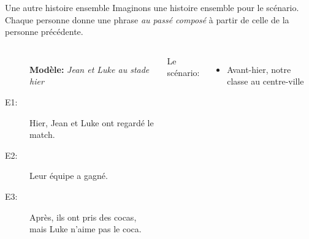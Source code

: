 \begin{frame}{Une autre histoire ensemble}
  Imaginons une histoire ensemble pour le scénario.
  Chaque personne donne une phrase \emph{au passé composé} à partir de celle de la personne précédente. \\
  \begin{columns}
      \small
      \begin{description}
        \item[] \textbf{Modèle:} \emph{Jean et Luke au stade hier}
        \item[E1:] Hier, Jean et Luke ont regardé le match.
        \item[E2:] Leur équipe a gagné.
        \item[E3:] Après, ils ont pris des cocas, mais Luke n'aime pas le coca.
      \end{description}
      \alert{Le scénario:}
      \begin{itemize}
        \item Avant-hier, notre classe au centre-ville
      \end{itemize}
  \end{columns}
\end{frame}